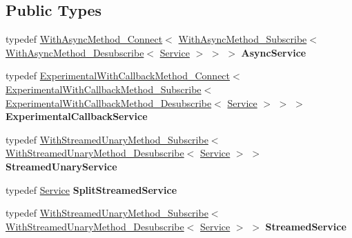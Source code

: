 \subsection*{Public Types}
\begin{DoxyCompactItemize}
\item 
\mbox{\label{classtbMessages_1_1TarboraMessages_a9b5eb5fd00782e12144011e86da48297}} 
typedef \hyperlink{classtbMessages_1_1TarboraMessages_1_1WithAsyncMethod__Connect}{With\+Async\+Method\+\_\+\+Connect}$<$ \hyperlink{classtbMessages_1_1TarboraMessages_1_1WithAsyncMethod__Subscribe}{With\+Async\+Method\+\_\+\+Subscribe}$<$ \hyperlink{classtbMessages_1_1TarboraMessages_1_1WithAsyncMethod__Desubscribe}{With\+Async\+Method\+\_\+\+Desubscribe}$<$ \hyperlink{classtbMessages_1_1TarboraMessages_1_1Service}{Service} $>$ $>$ $>$ {\bfseries Async\+Service}
\item 
\mbox{\label{classtbMessages_1_1TarboraMessages_afb14c53d556ec261ca79b61ba2b05694}} 
typedef \hyperlink{classtbMessages_1_1TarboraMessages_1_1ExperimentalWithCallbackMethod__Connect}{Experimental\+With\+Callback\+Method\+\_\+\+Connect}$<$ \hyperlink{classtbMessages_1_1TarboraMessages_1_1ExperimentalWithCallbackMethod__Subscribe}{Experimental\+With\+Callback\+Method\+\_\+\+Subscribe}$<$ \hyperlink{classtbMessages_1_1TarboraMessages_1_1ExperimentalWithCallbackMethod__Desubscribe}{Experimental\+With\+Callback\+Method\+\_\+\+Desubscribe}$<$ \hyperlink{classtbMessages_1_1TarboraMessages_1_1Service}{Service} $>$ $>$ $>$ {\bfseries Experimental\+Callback\+Service}
\item 
\mbox{\label{classtbMessages_1_1TarboraMessages_a9537b11ac0a4dbae9968bd2346c2e068}} 
typedef \hyperlink{classtbMessages_1_1TarboraMessages_1_1WithStreamedUnaryMethod__Subscribe}{With\+Streamed\+Unary\+Method\+\_\+\+Subscribe}$<$ \hyperlink{classtbMessages_1_1TarboraMessages_1_1WithStreamedUnaryMethod__Desubscribe}{With\+Streamed\+Unary\+Method\+\_\+\+Desubscribe}$<$ \hyperlink{classtbMessages_1_1TarboraMessages_1_1Service}{Service} $>$ $>$ {\bfseries Streamed\+Unary\+Service}
\item 
\mbox{\label{classtbMessages_1_1TarboraMessages_ad6188b91d15f7d77c1fcc78bebc07ae0}} 
typedef \hyperlink{classtbMessages_1_1TarboraMessages_1_1Service}{Service} {\bfseries Split\+Streamed\+Service}
\item 
\mbox{\label{classtbMessages_1_1TarboraMessages_aa99d34552791d221588b1f50f3f5f185}} 
typedef \hyperlink{classtbMessages_1_1TarboraMessages_1_1WithStreamedUnaryMethod__Subscribe}{With\+Streamed\+Unary\+Method\+\_\+\+Subscribe}$<$ \hyperlink{classtbMessages_1_1TarboraMessages_1_1WithStreamedUnaryMethod__Desubscribe}{With\+Streamed\+Unary\+Method\+\_\+\+Desubscribe}$<$ \hyperlink{classtbMessages_1_1TarboraMessages_1_1Service}{Service} $>$ $>$ {\bfseries Streamed\+Service}
\end{DoxyCompactItemize}
